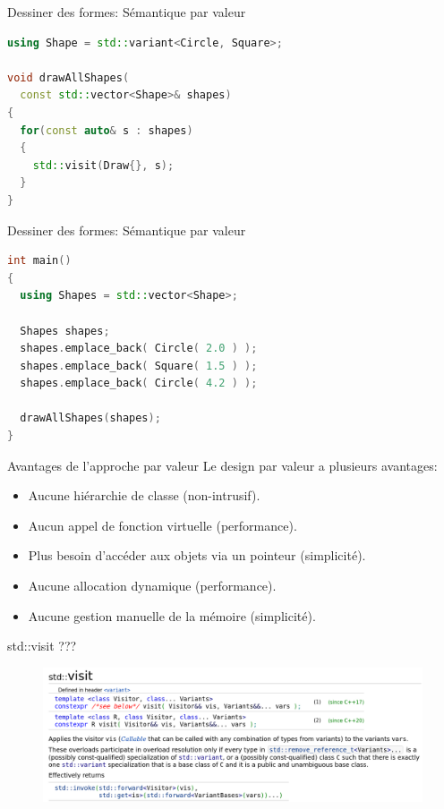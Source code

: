 \documentclass[french]{beamer}
\begin{document}
\begin{frame}[fragile]{Dessiner des formes: Sémantique par valeur}
    \begin{lstlisting}[language=C++]
using Shape = std::variant<Circle, Square>;

void drawAllShapes(
  const std::vector<Shape>& shapes)
{
  for(const auto& s : shapes)
  {
    std::visit(Draw{}, s);
  }
}
    \end{lstlisting}
\end{frame}

\begin{frame}[fragile]{Dessiner des formes: Sémantique par valeur}
    \begin{lstlisting}[language=C++]
int main()
{
  using Shapes = std::vector<Shape>;
 
  Shapes shapes;
  shapes.emplace_back( Circle( 2.0 ) );
  shapes.emplace_back( Square( 1.5 ) );
  shapes.emplace_back( Circle( 4.2 ) );
 
  drawAllShapes(shapes);
}
    \end{lstlisting}
\end{frame}

\begin{frame}{Avantages de l'approche par valeur}
    Le design par valeur a plusieurs avantages:
    \begin{itemize}
        \item Aucune hiérarchie de classe (non-intrusif).
        \item Aucun appel de fonction virtuelle (performance).
        \item Plus besoin d'accéder aux objets via un pointeur (simplicité).
        \item Aucune allocation dynamique (performance).
        \item Aucune gestion manuelle de la mémoire (simplicité).
    \end{itemize}
\end{frame}

\begin{frame}[fragile]{std::visit ???}
    \begin{figure}
        \includegraphics[width=\linewidth]{visit.png}
    \end{figure}
\end{frame}
\end{document}
